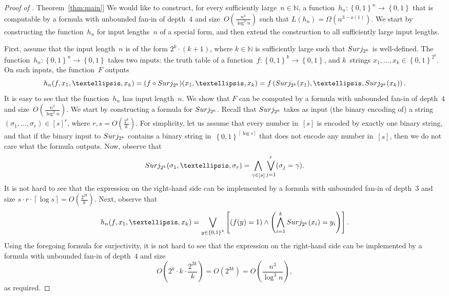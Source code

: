 \documentclass[11pt]{article}
\numberwithin{equation}{section}
\theoremstyle{definition}
\theoremstyle{plain}
\newcommand{\N}{\mathbb N}
\newcommand{\expref}[2]{\hyperref[#2]{#1~\ref{#2}}}
\theoremstyle{definition}\newtheorem{notation}[theorem]{Notation}\theoremstyle{plain}
\renewcommand{\N}{\mathbb{N}}
\newcommand{\B}{\left\{ 0,1 \right \}}
\newcommand{\surj}{\textup{\textsf{Surj}}}
\renewcommand{\d}{\diamond}
\theoremstyle{definition}
\theoremstyle{plain}
\begin{document}
\begin{proof}[Proof of \expref{Theorem}{thm:main}]
We would like to construct, for every sufficiently large~$n\in\N$,
a function~$h_{n}\colon\B^{n}\to\B$ that is computable by a formula
with unbounded fan-in of depth~$4$ and size~$O(\frac{n^{3}}{\log^{3}n})$
such that $L(h_{n})=\Omega(n^{3-o(1)})$. We start by constructing
the function~$h_{n}$ for input lengths~$n$ of a special form,
and then extend the construction to all sufficiently large input lengths.

First, assume that the input length~$n$ is of the form $2^{k}\cdot(k+1)$,
where $k\in\N$ is sufficiently large such that $\surj_{2^{k}}$ is
well-defined. The function~$h_{n}\colon\B^{n}\to\B$ takes two inputs:
the truth table of a function~$f\colon\B^{k}\to\B$, and $k$~strings
$x_{1},\ldots,x_{k}\in\B^{2^{k}}$. On such inputs, the function~$F$
outputs 
\[
h_{n}(f,x_{1},\ldots,x_{k})=(f\d\surj_{2^{k}})(x_{1},\ldots,x_{k})=f\left(\surj_{2^{k}}(x_{1}),\ldots,\surj_{2^{k}}(x_{k})\right).
\]
It is easy to see that the function~$h_{n}$ has input length~$n$.
We show that $F$ can be computed by a formula with unbounded fan-in
of depth~$4$ and size~$O(\frac{n^{3}}{\log^{3}n})$. We start by
constructing a formula for $\surj_{2^{k}}$. Recall that $\surj_{2^{k}}$
takes as input (the binary encoding of) a string $(\sigma_{1},\ldots,\sigma_{r})\in\left[s\right]^{r}$,
where $r,s=O(\frac{2^{k}}{k})$. For simplicity, let us assume that
every number in~$\left[s\right]$ is encoded by exactly one binary
string, and that if the binary input to $\surj_{2^{k}}$ contains
a binary string in~$\B^{\left\lceil \log s\right\rceil }$ that does
not encode any number in~$\left[s\right]$, then we do not care what
the formula outputs. Now, observe that 
\begin{equation}
\surj_{2^{k}}(\sigma_{1},\ldots,\sigma_{r})=\bigwedge_{\gamma\in\left[s\right]}\bigvee_{j=1}^{r}(\sigma_{j}=\gamma).\label{eq:surjectivity-formula}
\end{equation}
It is not hard to see that the expression on the right-hand side can
be implemented by a formula with unbounded fan-in of depth~$3$ and
size $s\cdot r\cdot\left\lceil \log s\right\rceil =O\!\left(\frac{2^{2k}}{k}\right)$.
Next, observe that 
\[
h_{n}(f,x_{1},\ldots,x_{k})=\bigvee_{y\in\B^{k}}\left[\left(f(y)=1\right)\wedge\left(\bigwedge_{i=1}^{k}\surj_{2^{k}}(x_{i})=y_{i}\right)\right].
\]
Using the foregoing formula for surjectivity, it is not hard to see
that the expression on the right-hand side can be implemented by a
formula with unbounded fan-in of depth~$4$ and size 
\[
O\!\left(2^{k}\cdot k\cdot\frac{2^{2k}}{k}\right)=O\!\left(2^{3k}\right)=O\!\left(\frac{n^{3}}{\log^{3}n}\right),
\]
as required.


\end{proof}
\end{document}
